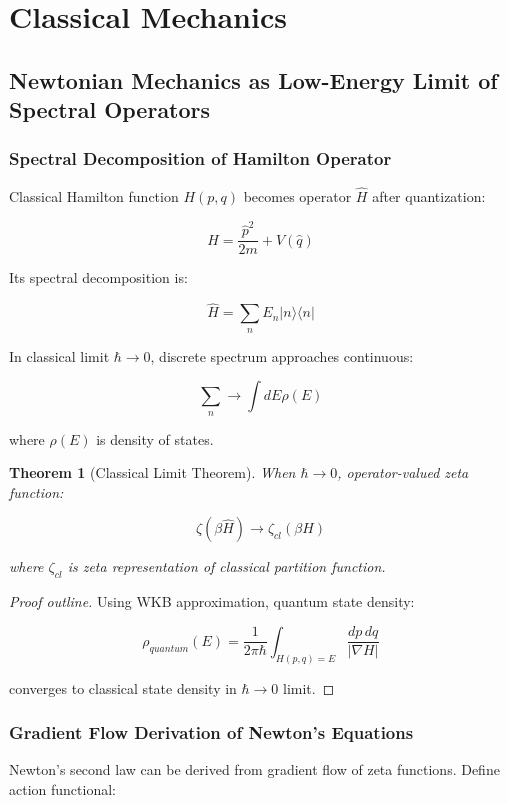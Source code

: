 \documentclass[12pt,a4paper]{article}
\newtheorem{theorem}{Theorem}[section]
\begin{document}
\section{Classical Mechanics}

\subsection{Newtonian Mechanics as Low-Energy Limit of Spectral Operators}

\subsubsection{Spectral Decomposition of Hamilton Operator}

Classical Hamilton function $H(p, q)$ becomes operator $\hat{H}$ after quantization:

$$\hat{H} = \frac{\hat{p}^2}{2m} + V(\hat{q})$$

Its spectral decomposition is:

$$\hat{H} = \sum_n E_n |n\rangle\langle n|$$

In classical limit $\hbar \to 0$, discrete spectrum approaches continuous:

$$\sum_n \to \int dE \rho(E)$$

where $\rho(E)$ is density of states.

\begin{theorem}[Classical Limit Theorem]
When $\hbar \to 0$, operator-valued zeta function:

$$\zeta(\beta\hat{H}) \to \zeta_{cl}(\beta H)$$

where $\zeta_{cl}$ is zeta representation of classical partition function.
\end{theorem}

\begin{proof}[Proof outline]
Using WKB approximation, quantum state density:

$$\rho_{quantum}(E) = \frac{1}{2\pi\hbar} \int_{H(p,q)=E} \frac{dp \, dq}{|\nabla H|}$$

converges to classical state density in $\hbar \to 0$ limit.
\end{proof}

\subsubsection{Gradient Flow Derivation of Newton's Equations}

Newton's second law can be derived from gradient flow of zeta functions. Define action functional:
\end{document}
